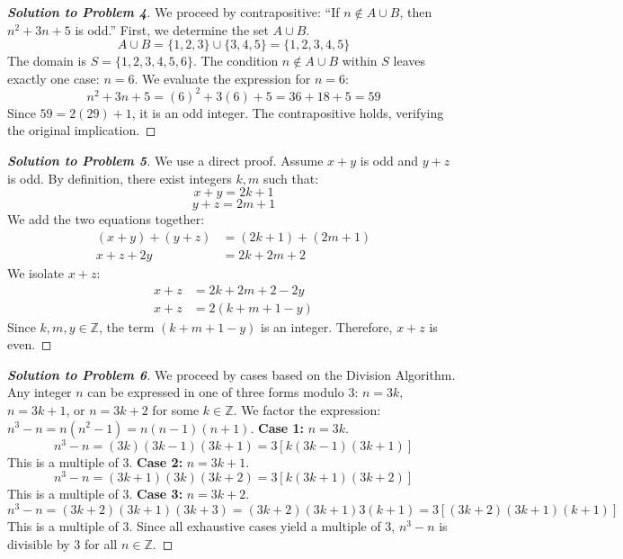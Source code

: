 \documentclass[11pt]{article}
\begin{document}
\begin{proof}[\textbf{Solution to Problem 4}]
We proceed by contrapositive: ``If $n \notin A \cup B$, then $n^2 + 3n + 5$ is odd.''
First, we determine the set $A \cup B$.
\[ A \cup B = \{1, 2, 3\} \cup \{3, 4, 5\} = \{1, 2, 3, 4, 5\} \]
The domain is $S = \{1, 2, 3, 4, 5, 6\}$. The condition $n \notin A \cup B$ within $S$ leaves exactly one case: $n = 6$.
We evaluate the expression for $n = 6$:
\[ n^2 + 3n + 5 = (6)^2 + 3(6) + 5 = 36 + 18 + 5 = 59 \]
Since $59 = 2(29) + 1$, it is an odd integer. The contrapositive holds, verifying the original implication.
\end{proof}

\begin{proof}[\textbf{Solution to Problem 5}]
We use a direct proof. Assume $x+y$ is odd and $y+z$ is odd. By definition, there exist integers $k, m$ such that:
\[ x + y = 2k + 1 \]
\[ y + z = 2m + 1 \]
We add the two equations together:
\begin{align*}
(x + y) + (y + z) &= (2k + 1) + (2m + 1) \\
x + z + 2y &= 2k + 2m + 2
\end{align*}
We isolate $x + z$:
\begin{align*}
x + z &= 2k + 2m + 2 - 2y \\
x + z &= 2(k + m + 1 - y)
\end{align*}
Since $k, m, y \in \mathbb{Z}$, the term $(k + m + 1 - y)$ is an integer. Therefore, $x+z$ is even.
\end{proof}

\begin{proof}[\textbf{Solution to Problem 6}]
We proceed by cases based on the Division Algorithm. Any integer $n$ can be expressed in one of three forms modulo 3: $n = 3k$, $n = 3k+1$, or $n = 3k+2$ for some $k \in \mathbb{Z}$. We factor the expression: $n^3 - n = n(n^2 - 1) = n(n-1)(n+1)$.
\textbf{Case 1:} $n = 3k$.
\[ n^3 - n = (3k)(3k-1)(3k+1) = 3[k(3k-1)(3k+1)] \]
This is a multiple of 3.
\textbf{Case 2:} $n = 3k + 1$.
\[ n^3 - n = (3k+1)(3k)(3k+2) = 3[k(3k+1)(3k+2)] \]
This is a multiple of 3.
\textbf{Case 3:} $n = 3k + 2$.
\[ n^3 - n = (3k+2)(3k+1)(3k+3) = (3k+2)(3k+1)3(k+1) = 3[(3k+2)(3k+1)(k+1)] \]
This is a multiple of 3.
Since all exhaustive cases yield a multiple of 3, $n^3 - n$ is divisible by 3 for all $n \in \mathbb{Z}$.
\end{proof}
\end{document}
